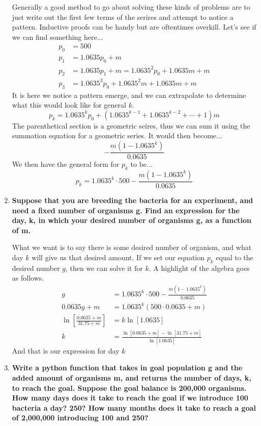 \documentclass[11pt]{article}
\begin{document}
\begin{enumerate}
            Generally a good method to go about solving these kinds of problems
            are to just write out the first few terms of the serires and
            attempt to notice a pattern. Inductive proofs can be handy but are
            oftentimes overkill. Let's see if we can find something here...
            \begin{align*}
                p_0 &= 500 \\
                p_1 &= 1.0635p_0 + m \\
                p_2 &= 1.0635p_1 + m = 1.0635^2 p_0 + 1.0635m + m \\
                p_3 &= 1.0635^3 p_0 + 1.0635^2 m + 1.0635m + m 
            \end{align*}
            It is here we notice a pattern emerge, and we can extrapolate to
            determine what this would look like for general $k$.
            \[
                p_k = 1.0635^kp_0 + (1.0635^{k-1} + 1.0635^{k-2} + \cdots + 1)m
            \] 
            The parenthetical section is a geometric seires, thus we can sum it
            using the summation equation for a geometric series. It would then
            become...
            \[
                -\frac{m(1-1.0635^k)}{0.0635} 
            \] 
            We then have the general form for $p_k$ to be...
            \[
                p_k = 1.0635^k \cdot {500} - \frac{m(1-1.0635^k)}{0.0635} 
            \] 
            \newpage
        \item \textbf{Suppose that you are breeding the bacteria for an experiment, 
            and need a fixed number of organisms g. Find an expression for the 
            day, k, in which your desired number of organisms g, as a function of m.}
            
            What we want is to say there is some desired number of organism,
            and what day $k$ will give us that desired amount. If we set our
            equation $p_k$ equal to the desired number $g$, then we can solve
            it for $k$. A highlight of the algebra goes as follows.
            \begin{align*}
                g &= 1.0635^k \cdot {500} - \frac{m(1-1.0635^k)}{0.0635} \\
                0.0635g + m &= 1.0635^k(500 \cdot 0.0635 + m) \\
                \ln{\left[ \frac{0.0635 + m}{31.75 + m} \right]} &= k \ln{\left[ 1.0635 \right]} \\
                k &= \frac{\ln{\left[ 0.0635 + m \right]} - \ln{\left[ 31.75 + m \right]}}
                          {\ln{\left[ 1.0635 \right]}} 
            \end{align*}
            And that is our expression for day $k$
        \item \textbf{Write a python function that takes in goal population g 
            and the added amount of organisms m, and returns the number of days, 
            k, to reach the goal. Suppose the goal balance is 200,000 organisms. 
            How many days does it take to reach the goal if we introduce 100 
            bacteria a day? 250? How many months does it take to reach a goal of 
            2,000,000 introducing 100 and 250?}


\end{enumerate}
\end{document}
